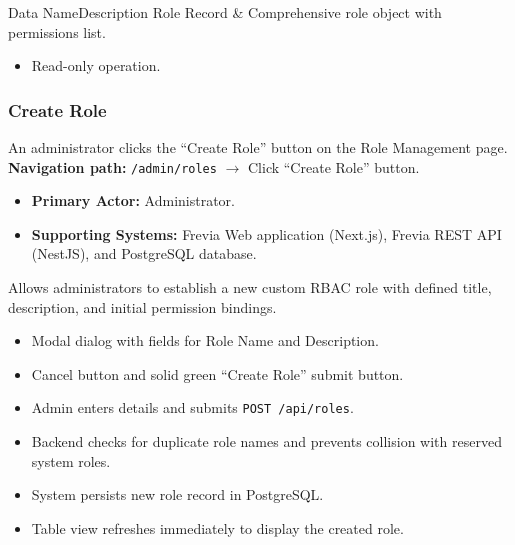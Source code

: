 \begin{specdatatable}{Data Name}{Description}
Role Record & Comprehensive role object with permissions list.\\ \hline
\end{specdatatable}

\begin{itemize}[leftmargin=1.6em,topsep=3pt,itemsep=2pt,parsep=0pt,label=$\bullet$]
    \item Read-only operation.
\end{itemize}

\subsubsection{ Create Role}

An administrator clicks the ``Create Role'' button on the Role Management page.\newline
\textbf{Navigation path:} \texttt{/admin/roles} $\rightarrow$ Click ``Create Role'' button.


\begin{itemize}[leftmargin=1.6em,topsep=3pt,itemsep=2pt,parsep=0pt,label=$\bullet$]
    \item \textbf{Primary Actor:} Administrator.
    \item \textbf{Supporting Systems:} Frevia Web application (Next.js), Frevia REST API (NestJS), and PostgreSQL database.
\end{itemize}

\noindent Allows administrators to establish a new custom RBAC role with defined title, description, and initial permission bindings.

\begin{itemize}[leftmargin=1.6em,topsep=3pt,itemsep=2pt,parsep=0pt,label=$\bullet$]
    \item Modal dialog with fields for Role Name and Description.
    \item Cancel button and solid green ``Create Role'' submit button.
\end{itemize}

\begin{itemize}[leftmargin=1.6em,topsep=3pt,itemsep=2pt,parsep=0pt,label=$\bullet$]
    \item Admin enters details and submits \texttt{POST /api/roles}.
    \item Backend checks for duplicate role names and prevents collision with reserved system roles.
    \item System persists new role record in PostgreSQL.
    \item Table view refreshes immediately to display the created role.
\end{itemize}

